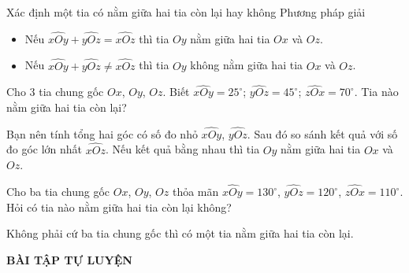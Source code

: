 \begin{dang}{Xác định một tia có nằm giữa hai tia còn lại hay không}
	Phương pháp giải
	\begin{itemize}
		\item Nếu $\widehat{xOy}+\widehat{yOz}=\widehat{xOz}$ thì tia $Oy$ nằm giữa hai tia $Ox$ và $Oz$.
		\item Nếu $\widehat{xOy}+\widehat{yOz}\ne \widehat{xOz}$ thì tia $Oy$ không nằm giữa hai tia $Ox$ và $Oz$.
	\end{itemize}
\end{dang}
\begin{vd}%
	Cho $3$ tia chung gốc $Ox$, $Oy$, $Oz$. Biết $\widehat{xOy}=25^\circ$; $\widehat{yOz}=45^\circ$; $\widehat{zOx}=70^\circ$. Tia nào nằm giữa hai tia còn lại?
\end{vd}
\begin{note}
	Bạn nên tính tổng hai góc có số đo nhỏ $\widehat{xOy}$, $\widehat{yOz}$. Sau đó so sánh kết quả với số đo góc lớn nhất $\widehat{xOz}$. Nếu kết quả bằng nhau thì tia $Oy$ nằm giữa hai tia $Ox$ và $Oz$.
\end{note}
\begin{vd}%
	Cho ba tia chung gốc $Ox$, $Oy$, $Oz$ thỏa mãn $\widehat{xOy}=130^\circ$, $\widehat{yOz}=120^\circ$, $\widehat{zOx}=110^\circ$. Hỏi có tia nào nằm giữa hai tia còn lại không?
\end{vd}
\begin{note}
	Không phải cứ ba tia chung gốc thì có một tia nằm giữa hai tia còn lại.
\end{note}
\begin{center}
\textbf{BÀI TẬP TỰ LUYỆN}
\end{center}
